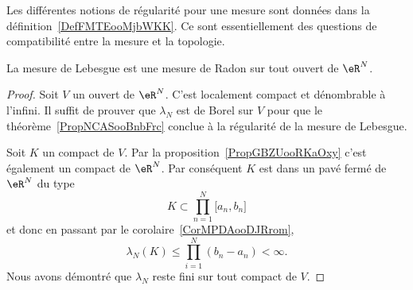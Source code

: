 																																								Les différentes notions de régularité pour une mesure sont données dans la définition~\ref{DefFMTEooMjbWKK}. Ce sont essentiellement des questions de compatibilité entre la mesure et la topologie.
																																								\begin{proposition}
																																								La mesure de Lebesgue est une mesure de Radon sur tout ouvert de \( \eR^N\).
																																								\end{proposition}

																																								\begin{proof}
																																								Soit \( V\) un ouvert de \( \eR^N\). C'est localement compact et dénombrable à l'infini. Il suffit de prouver que \( \lambda_N\) est de Borel sur \( V\) pour que le théorème~\ref{PropNCASooBnbFrc} conclue à la régularité de la mesure de Lebesgue.

																																								Soit \( K\) un compact de \( V\). Par la proposition~\ref{PropGBZUooRKaOxy} c'est également un compact de \( \eR^N\). Par conséquent \( K\) est dans un pavé fermé de \( \eR^N\) du type
																																								\begin{equation}
																																								K\subset \prod_{n=1}^N\mathopen[ a_n , b_n \mathclose]
																																								\end{equation}
																																								et donc en passant par le corolaire~\ref{CorMPDAooDJRrom},
																																								\begin{equation}
																																								\lambda_N(K)\leq \prod_{i=1}^N(b_n-a_n)<\infty.
																																								\end{equation}
																																								Nous avons démontré que \( \lambda_N\) reste fini sur tout compact de \( V\).
																																								\end{proof}
